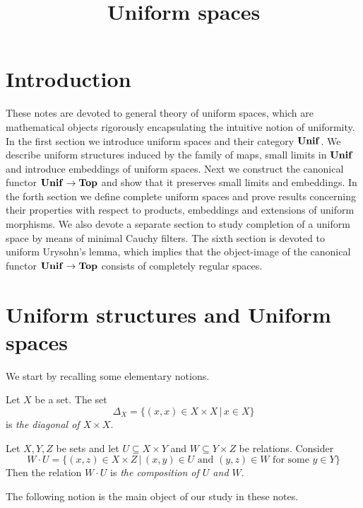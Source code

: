 



\title{Uniform spaces}
\date{}
\maketitle

\section{Introduction}
\noindent
These notes are devoted to general theory of uniform spaces, which are mathematical objects rigorously encapsulating the intuitive notion of uniformity. In the first section we introduce uniform spaces and their category $\mathbf{Unif}$. We describe uniform structures induced by the family of maps, small limits in $\mathbf{Unif}$ and introduce embeddings of uniform spaces. Next we construct the canonical functor $\mathbf{Unif}\rightarrow \mathbf{Top}$ and show that it preserves small limits and embeddings. In the forth section we define complete uniform spaces and prove results concerning their properties with respect to products, embeddings and extensions of uniform morphisms. We also devote a separate section to study completion of a uniform space by means of minimal Cauchy filters. 
The sixth section is devoted to uniform Urysohn's lemma, which implies that the object-image of the canonical functor $\mathbf{Unif} \rightarrow \mathbf{Top}$ consists of completely regular spaces.

\section{Uniform structures and Uniform spaces}
\noindent
We start by recalling some elementary notions.

\begin{definition}
Let $X$ be a set. The set
$$\Delta_X = \big\{(x,x) \in X\times X\,\big|\,x\in X\big\}$$
is \textit{the diagonal of $X\times X$}.
\end{definition}

\begin{definition}
Let $X,Y,Z$ be sets and let $U \subseteq X\times Y$ and $W \subseteq Y\times Z$ be relations. Consider
$$W\cdot U = \big\{(x,z) \in X\times Z\,\big|\,(x,y) \in U\mbox{ and }(y,z)\in W\mbox{ for some }y\in Y\big\}$$
Then the relation $W \cdot U$ is \textit{the composition of $U$ and $W$}.
\end{definition}
\noindent
The following notion is the main object of our study in these notes.

